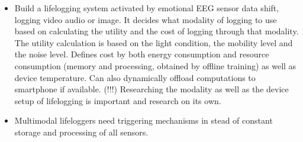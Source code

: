 \begin{itemize}
	\item \cite{jiang2019memento} Build a lifelogging system activated by emotional EEG sensor data shift, logging video audio or image. It decides what modality of logging to use based on calculating the utility and the cost of logging through that modality. The utility calculation is based on the light condition, the mobility level and the noise level. Defines cost by both energy consumption and resource consumption (memory and processing, obtained by offline training) as well as device temperature. Can also dynamically offload computations to smartphone if available. (!!!) Researching the modality as well as the device setup of lifelogging is important and research on its own.
	\item \cite{jiang2019memento} Multimodal lifeloggers need triggering mechanisms in stead of constant storage and processing of all sensors.
\end{itemize}

